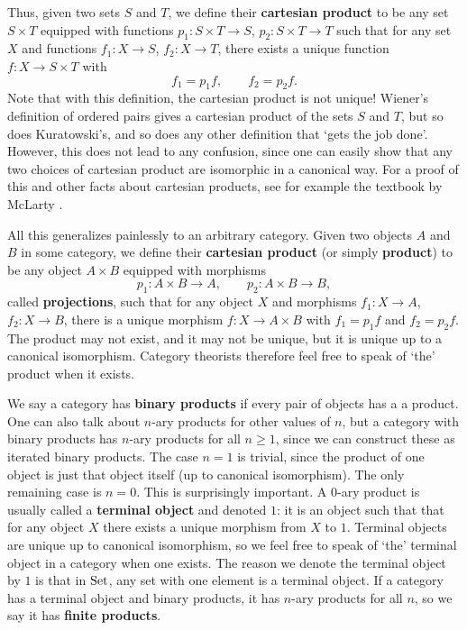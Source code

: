 \documentclass{article}
\newcommand{\Set}{{\rm Set}}
\renewcommand{\to}{\rightarrow}
\newcommand{\maps}{\colon}
\begin{document}
Thus, given two sets $S$ and $T$, we define their {\bf 
cartesian product} to be any set $S \times T$ equipped with 
functions $p_1 \maps S \times T \to S$, $p_2 \maps S \times T \to T$
such that for any set $X$ and functions $f_1 \maps X \to S$, 
$f_2 \maps X \to T$, there exists a unique function 
$f \maps X \to S \times T$ with 
\[        f_1 = p_1 f, \qquad  f_2 = p_2 f.  \]
Note that with this definition, the cartesian product is not unique!
Wiener's definition of ordered pairs gives a cartesian product of the
sets $S$ and $T$, but so does Kuratowski's, and so does any
other definition that `gets the job done'.  However, this does not
lead to any confusion, since one can easily show that any two choices
of cartesian product are isomorphic in a canonical way.  For a proof
of this and other facts about cartesian products, see for example the
textbook by McLarty \cite{McLarty}.

All this generalizes painlessly to an arbitrary category.
Given two objects $A$ and $B$ in some category, 
we define their {\bf cartesian product} (or simply {\bf product})
to be any object $A \times B$ equipped with morphisms 
\[          p_1 \maps A \times B \to A, \qquad
          p_2 \maps A \times B \to B,  \]
called {\bf projections}, such that for any object $X$ and morphisms
$f_1 \maps X \to A$, $f_2 \maps X \to B$, there is a unique morphism
$f \maps X \to A \times B$ with $f_1 = p_1 f$ and $f_2 = p_2 f$.  The
product may not exist, and it may not be unique, but it is unique up
to a canonical isomorphism.  Category theorists therefore feel free to
speak of `the' product when it exists.

We say a category has {\bf binary products} if every pair of objects
has a a product.  One can also talk about $n$-ary products for other
values of $n$, but a category with binary products has $n$-ary
products for all $n \ge 1$, since we can construct these as iterated
binary products.  The case $n = 1$ is trivial, since the product of
one object is just that object itself (up to canonical isomorphism).
The only remaining case is $n = 0$.  This is surprisingly important.
A $0$-ary product is usually called a {\bf terminal object} and
denoted $1$: it is an object such that that for any object $X$ there
exists a unique morphism from $X$ to $1$.  Terminal objects are unique
up to canonical isomorphism, so we feel free to speak of `the'
terminal object in a category when one exists.  The reason we denote
the terminal object by $1$ is that in $\Set$, any set with one element
is a terminal object.  If a category has a terminal object and binary
products, it has $n$-ary products for all $n$, so we say it has {\bf
finite products}.
\end{document}
